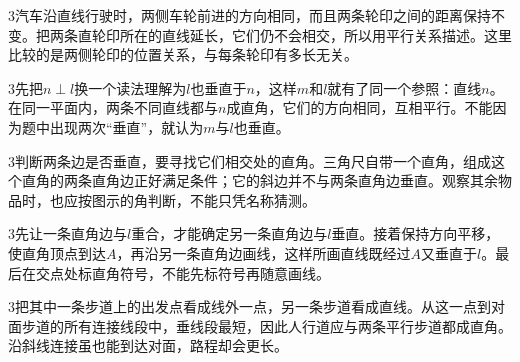 \documentclass[multi=snippet,border={5bp 20bp 5bp 5bp}]{standalone}
\newenvironment{snippet}[3]{\begin{minipage}{#1bp}\color{answerred}\fontsize{#2}{#3}\selectfont\raggedright}{\end{minipage}}
\begin{document}
\begin{snippet}{505}{11.5}{14}\begin{multicols}{3}\raggedcolumns 汽车沿直线行驶时，两侧车轮前进的方向相同，而且两条轮印之间的距离保持不变。把两条直轮印所在的直线延长，它们仍不会相交，所以用平行关系描述。这里比较的是两侧轮印的位置关系，与每条轮印有多长无关。\end{multicols}\end{snippet}
\begin{snippet}{505}{11.5}{14}\begin{multicols}{3}\raggedcolumns 先把\(n\perp l\)\allowbreak 换一个读法理解为\(l\)\allowbreak 也垂直于\(n\)\allowbreak ，这样\(m\)\allowbreak 和\(l\)\allowbreak 就有了同一个参照：直线\(n\)\allowbreak 。在同一平面内，两条不同直线都与\(n\)\allowbreak 成直角，它们的方向相同，互相平行。不能因为题中出现两次“垂直”，就认为\(m\)\allowbreak 与\(l\)\allowbreak 也垂直。\end{multicols}\end{snippet}
\begin{snippet}{505}{11.5}{14}\begin{multicols}{3}\raggedcolumns 判断两条边是否垂直，要寻找它们相交处的直角。三角尺自带一个直角，组成这个直角的两条直角边正好满足条件；它的斜边并不与两条直角边垂直。观察其余物品时，也应按图示的角判断，不能只凭名称猜测。\end{multicols}\end{snippet}
\begin{snippet}{505}{11.5}{14}\begin{multicols}{3}\raggedcolumns 先让一条直角边与\(l\)\allowbreak 重合，才能确定另一条直角边与\(l\)\allowbreak 垂直。接着保持方向平移，使直角顶点到达\(A\)\allowbreak ，再沿另一条直角边画线，这样所画直线既经过\(A\)\allowbreak 又垂直于\(l\)\allowbreak 。最后在交点处标直角符号，不能先标符号再随意画线。\end{multicols}\end{snippet}
\begin{snippet}{505}{11.5}{14}\begin{multicols}{3}\raggedcolumns 把其中一条步道上的出发点看成线外一点，另一条步道看成直线。从这一点到对面步道的所有连接线段中，垂线段最短，因此人行道应与两条平行步道都成直角。沿斜线连接虽也能到达对面，路程却会更长。\end{multicols}\end{snippet}
\end{document}
